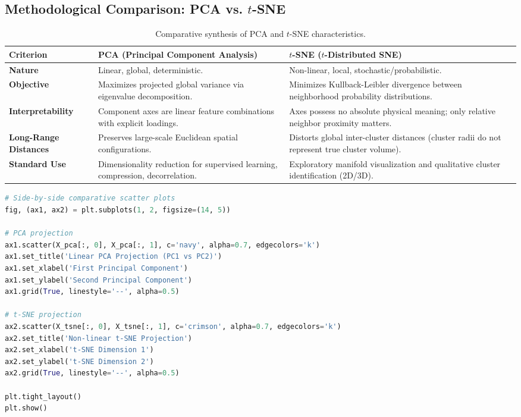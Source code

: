 \subsection{Methodological Comparison: PCA vs. $t$-SNE}

\begin{table}[htbp]
    \centering
    \small
    \begin{tabularx}{\textwidth}{lXX}
        \toprule
        \textbf{Criterion} & \textbf{PCA (Principal Component Analysis)} & \textbf{$t$-SNE ($t$-Distributed SNE)} \\
        \midrule
        \textbf{Nature} & Linear, global, deterministic. & Non-linear, local, stochastic/probabilistic. \\
        \addlinespace
        \textbf{Objective} & Maximizes projected global variance via eigenvalue decomposition. & Minimizes Kullback-Leibler divergence between neighborhood probability distributions. \\
        \addlinespace
        \textbf{Interpretability} & Component axes are linear feature combinations with explicit loadings. & Axes possess no absolute physical meaning; only relative neighbor proximity matters. \\
        \addlinespace
        \textbf{Long-Range Distances} & Preserves large-scale Euclidean spatial configurations. & Distorts global inter-cluster distances (cluster radii do not represent true cluster volume). \\
        \addlinespace
        \textbf{Standard Use} & Dimensionality reduction for supervised learning, compression, decorrelation. & Exploratory manifold visualization and qualitative cluster identification (2D/3D). \\
        \bottomrule
    \end{tabularx}
    \caption{Comparative synthesis of PCA and $t$-SNE characteristics.}
    \label{tab:dm-pca-vs-tsne}
\end{table}

\begin{lstlisting}[language=Python, style=code]
# Side-by-side comparative scatter plots
fig, (ax1, ax2) = plt.subplots(1, 2, figsize=(14, 5))

# PCA projection
ax1.scatter(X_pca[:, 0], X_pca[:, 1], c='navy', alpha=0.7, edgecolors='k')
ax1.set_title('Linear PCA Projection (PC1 vs PC2)')
ax1.set_xlabel('First Principal Component')
ax1.set_ylabel('Second Principal Component')
ax1.grid(True, linestyle='--', alpha=0.5)

# t-SNE projection
ax2.scatter(X_tsne[:, 0], X_tsne[:, 1], c='crimson', alpha=0.7, edgecolors='k')
ax2.set_title('Non-linear t-SNE Projection')
ax2.set_xlabel('t-SNE Dimension 1')
ax2.set_ylabel('t-SNE Dimension 2')
ax2.grid(True, linestyle='--', alpha=0.5)

plt.tight_layout()
plt.show()
\end{lstlisting}
